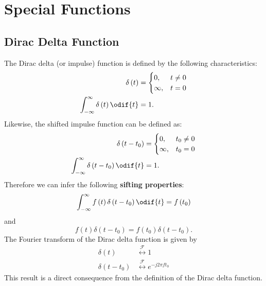 \documentclass{article}
\begin{document}
\section{Special Functions}
\subsection{Dirac Delta Function}
The Dirac delta (or impulse) function is defined by the following
characteristics:
\begin{align*}
    \delta\left( t \right)                                & =
                                                              \begin{cases}
                                                                  0,      & t \neq 0 \\
                                                                  \infty, & t = 0
                                                              \end{cases}
    \\
    \int_{-\infty}^\infty \delta\left( t \right) \odif{t} & = 1.
\end{align*}
Likewise, the shifted impulse function can be defined as:
\begin{align*}
    \delta\left( t - t_0 \right)                                & =
                                                                    \begin{cases}
                                                                        0,      & t_0 \neq 0 \\
                                                                        \infty, & t_0 = 0
                                                                    \end{cases}
    \\
    \int_{-\infty}^\infty \delta\left( t - t_0 \right) \odif{t} & = 1.
\end{align*}
Therefore we can infer the following \textbf{sifting properties}:
\begin{equation*}
    \int_{-\infty}^\infty f\left( t \right) \delta\left( t - t_0 \right) \odif{t} = f\left( t_0 \right)
\end{equation*}
and
\begin{equation*}
    f\left( t \right) \delta\left( t - t_0 \right) = f\left( t_0 \right) \delta\left( t - t_0 \right).
\end{equation*}
The Fourier transform of the Dirac delta function is given by
\begin{align*}
    \delta\left( t \right)       & \overset{\mathscr{F}}{\longleftrightarrow} 1                 \\
    \delta\left( t - t_0 \right) & \overset{\mathscr{F}}{\longleftrightarrow} e^{-j 2\pi f t_0}
\end{align*}
This result is a direct consequence from the definition of the Dirac delta function.
\end{document}
